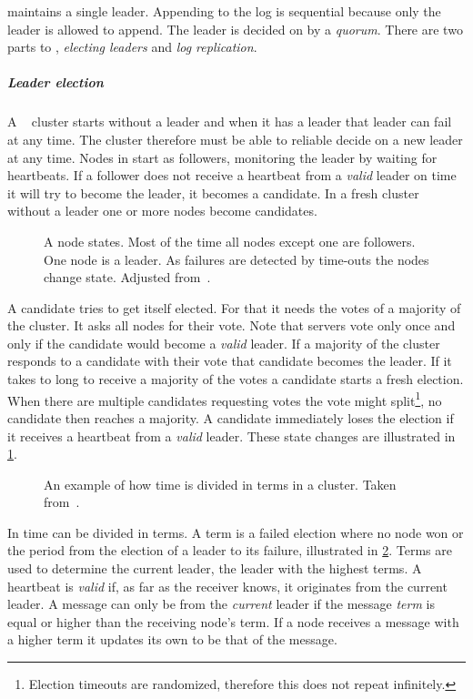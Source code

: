 \raft{} maintains a single leader. Appending to the log is sequential because only the leader is allowed to append. The leader is decided on by a \textit{quorum}. There are two parts to \raft{}, \textit{electing leaders} and \textit{log replication}.

\subparagraph{Leader election} \label{sec:valid}
A \raft{}~\cite{raft} cluster starts without a leader and when it has a leader that leader can fail at any time. The cluster therefore must be able to reliable decide on a new leader at any time. Nodes in \raft{} start as followers, monitoring the leader by waiting for heartbeats. If a follower does not receive a heartbeat from a \emph{valid} leader on time it will try to become the leader, it becomes a candidate. In a fresh cluster without a leader one or more nodes become candidates.

\begin{figure}[htbp]
	\centering
	
	\caption{A \raft{} node states. Most of the time all nodes except one are followers. One node is a leader. As failures are detected by time-outs the nodes change state. Adjusted from~\cite{raft}.}
	\label{fig:raft_states}
\end{figure}
%
A candidate tries to get itself elected. For that it needs the votes of a majority of the cluster. It asks all nodes for their vote. Note that servers vote only once and only if the candidate would become a \emph{valid} leader. If a majority of the cluster responds to a candidate with their vote that candidate becomes the leader. If it takes to long to receive a majority of the votes a candidate starts a fresh election. When there are multiple candidates requesting votes the vote might split\footnote{Election timeouts are randomized, therefore this does not repeat infinitely.}, no candidate then reaches a majority. A candidate immediately loses the election if it receives a heartbeat from a \emph{valid} leader. These state changes are illustrated in \cref{fig:raft_states}.

\begin{figure}[htbp]
	\centering
	
	\caption{An example of how time is divided in terms in a \raft{} cluster. Taken from~\cite{raft}.}
	\label{fig:raft_terms}
\end{figure}

In \raft{} time can be divided in terms. A term is a failed election where no node won or the period from the election of a leader to its failure, illustrated in \cref{fig:raft_terms}. Terms are used to determine the current leader, the leader with the highest terms. A heartbeat is \emph{valid} if, as far as the receiver knows, it originates from the current leader. A message can only be from the \textit{current} leader if the message \textit{term} is equal or higher than the receiving node's term. If a node receives a message with a higher term it updates its own to be that of the message.


